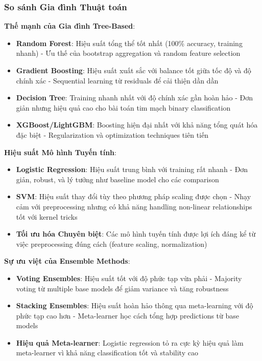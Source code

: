 \subsubsection{So sánh Gia đình Thuật toán}

\textbf{Thế mạnh của Gia đình Tree-Based}:
\begin{itemize}
    \item \textbf{Random Forest}: Hiệu suất tổng thể tốt nhất (100\% accuracy, training nhanh) - Ưu thế của bootstrap aggregation và random feature selection
    \item \textbf{Gradient Boosting}: Hiệu suất xuất sắc với balance tốt giữa tốc độ và độ chính xác - Sequential learning từ residuals để cải thiện dần dần
    \item \textbf{Decision Tree}: Training nhanh nhất với độ chính xác gần hoàn hảo - Đơn giản nhưng hiệu quả cao cho bài toán tim mạch binary classification
    \item \textbf{XGBoost/LightGBM}: Boosting hiện đại nhất với khả năng tổng quát hóa đặc biệt - Regularization và optimization techniques tiên tiến
\end{itemize}

\textbf{Hiệu suất Mô hình Tuyến tính}:
\begin{itemize}
    \item \textbf{Logistic Regression}: Hiệu suất trung bình với training rất nhanh - Đơn giản, robust, và lý tưởng như baseline model cho các comparison
    \item \textbf{SVM}: Hiệu suất thay đổi tùy theo phương pháp scaling được chọn - Nhạy cảm với preprocessing nhưng có khả năng handling non-linear relationships tốt với kernel tricks
    \item \textbf{Tối ưu hóa Chuyên biệt}: Các mô hình tuyến tính được lợi ích đáng kể từ việc preprocessing đúng cách (feature scaling, normalization)
\end{itemize}

\textbf{Sự ưu việt của Ensemble Methods}:
\begin{itemize}
    \item \textbf{Voting Ensembles}: Hiệu suất tốt với độ phức tạp vừa phải - Majority voting từ multiple base models để giảm variance và tăng robustness
    \item \textbf{Stacking Ensembles}: Hiệu suất hoàn hảo thông qua meta-learning với độ phức tạp cao hơn - Meta-learner học cách tổng hợp predictions từ base models
    \item \textbf{Hiệu quả Meta-learner}: Logistic regression tỏ ra cực kỳ hiệu quả làm meta-learner vì khả năng classification tốt và stability cao
\end{itemize}

